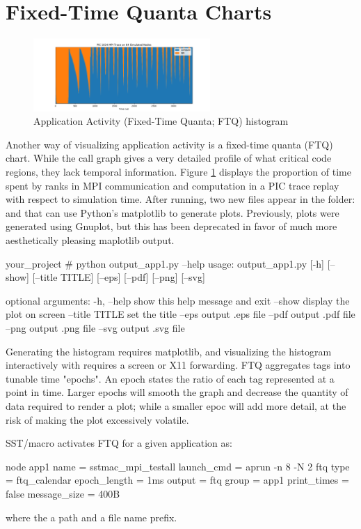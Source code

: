 

\section{Fixed-Time Quanta Charts}

\label{sec:tutorials:ftq}

\begin{figure}[h!]
\centering
\includegraphics[width=0.6\textwidth]{figures/matplotlib/ftq/pic1024.png}
\caption{Application Activity (Fixed-Time Quanta; FTQ) histogram}
\label{fig:ftq}
\end{figure}

Another way of visualizing application activity is a fixed-time quanta (FTQ) chart.
While the call graph gives a very detailed profile of what critical code regions, they lack temporal information. 
Figure \ref{fig:ftq} displays the proportion of time spent by ranks in MPI communication and computation in a PIC trace replay with respect to simulation time.
After running, two new files appear in the folder:  and  that can use Python's matplotlib to generate plots.
Previously, plots were generated using Gnuplot, but this has been deprecated in favor of much more aesthetically pleasing maplotlib output.

\begin{ShellCmd}
your_project # python output_app1.py --help
usage: output_app1.py [-h] [--show] [--title TITLE] [--eps] [--pdf] [--png]
                      [--svg]

optional arguments:
  -h, --help     show this help message and exit
  --show         display the plot on screen
  --title TITLE  set the title
  --eps          output .eps file
  --pdf          output .pdf file
  --png          output .png file
  --svg          output .svg file
\end{ShellCmd}

Generating the histogram requires matplotlib, and visualizing the histogram interactively with  requires a screen or X11 forwarding.
FTQ aggregates tags into tunable time "epochs".
An epoch states the ratio of each tag represented at a point in time.
Larger epochs will smooth the graph and decrease the quantity of data required to render a plot; while a smaller epoc will add more detail, at the risk of making the plot excessively volatile.


SST/macro activates FTQ for a given application as:

\begin{ViFile}
node {
 app1 {
  name = sstmac_mpi_testall
  launch_cmd = aprun -n 8 -N 2
  ftq {
   type = ftq_calendar
   epoch_length = 1ms
   output = ftq
   group = app1
  }
  print_times = false
  message_size = 400B
 }
}
\end{ViFile}
where the  a path and a file name prefix.
